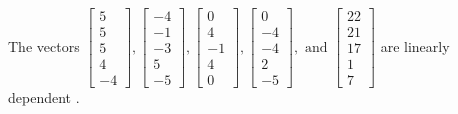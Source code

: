 \begin{exercise}
\begin{exerciseStatement}
  \end{exerciseStatement}
  \begin{exerciseAnswer}
   The vectors \(\left[\begin{array}{r}
5 \\
5 \\
5 \\
4 \\
-4
\end{array}\right] , \left[\begin{array}{r}
-4 \\
-1 \\
-3 \\
5 \\
-5
\end{array}\right] , \left[\begin{array}{r}
0 \\
4 \\
-1 \\
4 \\
0
\end{array}\right] , \left[\begin{array}{r}
0 \\
-4 \\
-4 \\
2 \\
-5
\end{array}\right] , \text{ and } \left[\begin{array}{r}
22 \\
21 \\
17 \\
1 \\
7
\end{array}\right]\) are 
  	 linearly dependent  .
  


  \end{exerciseAnswer}
\end{exercise}